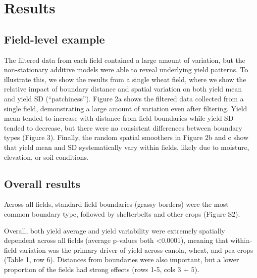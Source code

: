 \documentclass[]{elsarticle} %
\begin{document}
\hypertarget{results}{%
\section{Results}\label{results}}

\hypertarget{field-level-example}{%
\subsection{Field-level example}\label{field-level-example}}

The filtered data from each field contained a large amount of variation, but the non-stationary additive models were able to reveal underlying yield patterns.
To illustrate this, we show the results from a single wheat field, where we show the relative impact of boundary distance and spatial variation on both yield mean and yield SD (``patchiness'').
Figure 2a shows the filtered data collected from a single field, demonstrating a large amount of variation even after filtering.
Yield mean tended to increase with distance from field boundaries while yield SD tended to decrease, but there were no consistent differences between boundary types (Figure 3).
Finally, the random spatial smoothers in Figure 2b and c show that yield mean and SD systematically vary within fields, likely due to moisture, elevation, or soil conditions.

\hypertarget{overall-results}{%
\subsection{Overall results}\label{overall-results}}

Across all fields, standard field boundaries (grassy borders) were the most common boundary type, followed by shelterbelts and other crops (Figure S2).

Overall, both yield average and yield variability were extremely spatially dependent across all fields (average p-values both \textless0.0001), meaning that within-field variation was the primary driver of yield across canola, wheat, and pea crops (Table 1, row 6).
Distances from boundaries were also important, but a lower proportion of the fields had strong effects (rows 1-5, cols 3 + 5).
\end{document}
